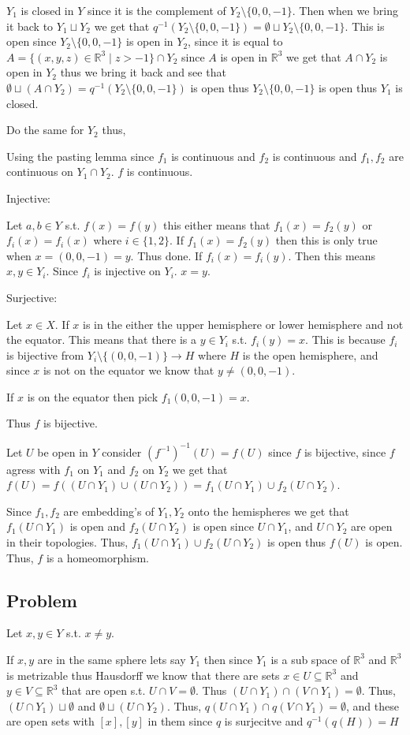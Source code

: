 \documentclass[12pt, letterpaper]{article}
\newcounter{problem}
\newcommand{\q}{
    \newpage %
    \stepcounter{problem} %
    \subsection*{Problem \arabic{problem}} %
}
\newcommand{\R}{\mathbb{R}}
\begin{document}
$Y_1$ is closed in $Y$ since it is the complement of $Y_2 \setminus \{0,0,-1\}$. Then when we bring it back to $Y_1 \sqcup Y_2$ we get that $q^{-1}(Y_2 \setminus \{0,0,-1\})=\emptyset \sqcup Y_2 \setminus \{0,0,-1\}$. This is open since $Y_2 \setminus \{0,0,-1\}$ is open in $Y_2$, since it is equal to $A=\{(x,y,z) \in \R^3 \mid z > -1\} \cap Y_2$ since $A$ is open in $\R^3$ we get that $A \cap Y_2$ is open in $Y_2$ thus we bring it back and see that $\emptyset \sqcup (A \cap Y_2)=q^{-1}(Y_2 \setminus \{0,0,-1\})$ is open thus $Y_2 \setminus \{0,0,-1\}$ is open thus $Y_1$ is closed.

Do the same for $Y_2$ thus,

Using the pasting lemma since $f_1$ is continuous and $f_2$ is continuous and $f_1,f_2$ are continuous on $Y_1 \cap Y_2$. $f$ is continuous.

Injective:

Let $a,b \in Y$ s.t. $f(x)=f(y)$ this either means that $f_1(x)=f_2(y)$ or $f_i(x)=f_i(x)$ where $i \in \{1,2\}$. If $f_1(x)=f_2(y)$ then this is only true when $x=(0,0,-1)=y$. Thus done. If $f_i(x)=f_i(y)$. Then this means $x,y \in Y_i$. Since $f_i$ is injective on $Y_i$. $x=y$.

Surjective:

Let $x \in X$. If $x$ is in the either the upper hemisphere or lower hemisphere and not the equator. This means that there is a $y \in Y_i$ s.t. $f_i(y)=x$. This is because $f_i$ is bijective from $Y_i\setminus \{(0,0,-1)\} \to H$ where $H$ is the open hemisphere, and since $x$ is not on the equator we know that $y \neq (0,0,-1)$.

If $x$ is on the equator then pick $f_1(0,0,-1)=x$.

Thus $f$ is bijective.

Let $U$ be open in $Y$ consider $(f^{-1})^{-1}(U)=f(U)$ since $f$ is bijective, since $f$ agress with $f_1$ on $Y_1$ and $f_2$ on $Y_2$ we get that $f(U)=f((U \cap Y_1) \cup (U \cap Y_2))=f_1(U \cap Y_1) \cup f_2(U \cap Y_2)$.

Since $f_1,f_2$ are embedding's of $Y_1,Y_2$ onto the hemispheres we get that $f_1(U \cap Y_1)$ is open and $f_2(U \cap Y_2)$ is open since $U \cap Y_1$, and $U \cap Y_2$ are open in their topologies. Thus, $f_1(U \cap Y_1) \cup f_2(U \cap Y_2)$ is open thus $f(U)$ is open. Thus, $f$ is a homeomorphism.

\q
Let $x,y \in Y$ s.t. $x \neq y$.

If $x,y$ are in the same sphere lets say $Y_1$ then since $Y_1$ is a sub space of $\R^3$ and $\R^3$ is metrizable thus Hausdorff we know that there are sets $x \in U \subseteq \R^3$ and $y \in V\subseteq \R^3$ that are open s.t. $U \cap V = \emptyset$. Thus $(U \cap Y_1) \cap (V \cap Y_1) = \emptyset$. Thus, $(U \cap Y_1) \sqcup \emptyset$ and $\emptyset \sqcup (U \cap Y_2)$. Thus, $q(U \cap Y_1) \cap q(V \cap Y_1) = \emptyset$, and these are open sets with $[x],[y]$ in them since $q$ is surjecitve and $q^{-1}(q(H))=H$
\end{document}
